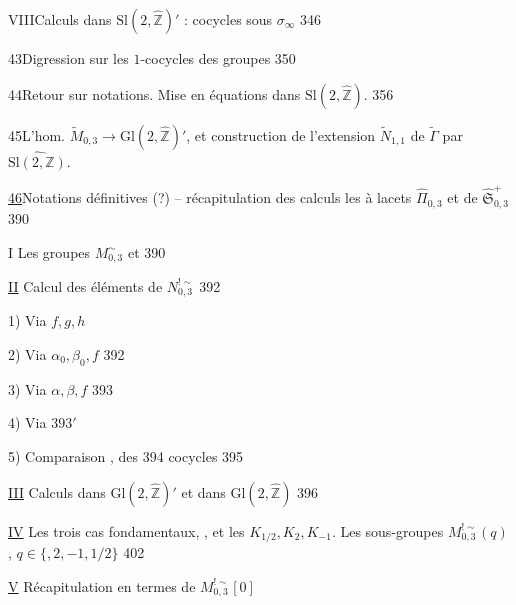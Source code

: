 VIII\quad Calculs dans $\mathrm{Sl}(2,\widehat{\mathbb Z})'$ :
cocycles sous $\sigma_\infty$
\hfill 346


43\quad Digression sur les $1$-cocycles des groupes 
\hfill 350

44\quad Retour sur notations.
Mise en équations dans $\mathrm{Sl}(2,\widehat{\mathbb Z})$.
\hfill 356

45\quad L'hom.
$\widetilde{M}_{0,3}\longrightarrow \mathrm{Gl}(2,\widehat{\mathbb Z})'$,
et construction de l'extension $\widetilde{N}_{1,1}$
de $\widetilde{\Gamma}$ par $\widehat{\mathrm{Sl}(2,\mathbb Z)}$.
\hfill {}

\uline{46}\quad Notations définitives (?) -- récapitulation
des calculs  les  à lacets
 $\widehat{\Pi}_{0,3}$ et de
$\widehat{\mathfrak S}_{0,3}^{+}$
\hfill 390



I Les groupes \(M_{0,3}^{\sim}\) et  \hfill 390

\uline{II} Calcul des éléments de \(N_{0,3}^{!\sim}\) \hfill 392

1) Via \(f,g,h\)

2) Via \(\alpha_0,\beta_0,f\) \hfill 392

3) Via \(\alpha,\beta,f\) \hfill 393

4) Via  \hfill \(393'\)

5) Comparaison  ,  des \hfill 394
cocycles \hfill 395

\uline{III} Calculs dans \(\mathrm{Gl}(2,\widehat{\mathbb Z})'\) et dans \(\mathrm{Gl}(2,\widehat{\mathbb Z})\) \hfill 396

\uline{IV} Les trois cas fondamentaux, 
, et les 
\(K_{1/2},K_2,K_{-1}\). Les sous-groupes \(M_{0,3}^{!\sim}(q)\),
\(q\in\{\)\(,2,-1,1/2\}\)
\hfill {} 402

\uline{V} Récapitulation en termes de \(M_{0,3}^{!\sim}[0]\)
\hfill {}

